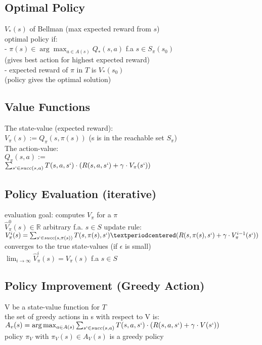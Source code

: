 \subsection*{Optimal Policy}
$V_{*}(s)$ of Bellman (max expected reward from $s$) \\
optimal policy if: \\
- $\pi(s) \in \arg\max_{a \in A(s)} Q_{*}(s, a)$ f.a $s \in S_{\pi}(s_{0})$\\
(gives best action for highest expected reward)\\
- expected reward of $\pi$ in $T$ is $V_{*}(s_{0})$ \\
(policy gives the optimal solution)
\subsection*{Value Functions}
The state-value (expected reward): \\
$V_{\pi}(s) := Q_{\pi}(s, \pi(s))$ (s is in the reachable set $S_{\pi}$)\\
The action-value: \\
$Q_{\pi}(s, a):=$ \\
$\sum_{s` \in succ(s, a)} T(s, a, s`) \cdot (R(s,a,s`) + \gamma \cdot V_{\pi}(s`))$

\subsection*{Policy Evaluation (iterative)}
evaluation goal: computes $V_{\pi}$ for a $\pi$ \\
$\hat{V}^{0}_{\pi}(s) \in \mathbb{R}$ arbitrary f.a. $s \in S$  update rule: \\
$V^{i}_{\pi}(s) = \sum_{s`\in succ(s,\pi(s))} T (s, \pi(s), s`)·(R(s, \pi(s), s`) + \gamma \cdot V^{i-1}_{\pi}(s`))$ \\
converges to the true state-values (if $\epsilon$ is small) \\
$\lim_{i \rightarrow \infty} \hat{V}^{i}_{\pi}(s) = V_{\pi}(s)$ \quad f.a $s \in S$ 


\subsection*{Policy Improvement (Greedy Action)}
V be a state-value function for $T$\\
the set of greedy actions in s with respect to V is: \\
$A_{v}(s) =  \arg\max_{a \in A(s)} \sum_{s` \in succ(s,a)} T(s, a, s`) \cdot (R(s,a,s`) + \gamma \cdot V(s`))$ \\
policy $\pi_V$ with $\pi_V(s) \in A_V(s)$ is a greedy policy

